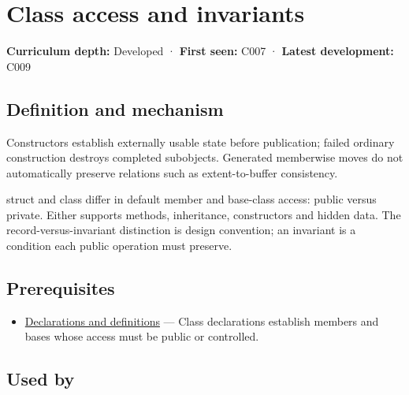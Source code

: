 \hypertarget{appendix-8e5214819615}{}\label{referencestart:appendix-8e5214819615}
\section{Class access and invariants}\label{appendix-8e5214819615-class-access-and-invariants}

\hypertarget{appendix-8e5214819615-class-access-and-invariants}{}

\textbf{Curriculum depth:} Developed · \textbf{First seen:} C007 · \textbf{Latest development:} C009

\begin{allmightroledefinition}

\subsection{Definition and mechanism}\label{appendix-8e5214819615-definition-and-mechanism}

\hypertarget{appendix-8e5214819615-definition-and-mechanism}{}

Constructors establish externally usable state before publication; failed ordinary construction destroys completed subobjects. Generated memberwise moves do not automatically preserve relations such as extent-to-buffer consistency.

\end{allmightroledefinition}

struct and class differ in default member and base-class access: public versus private. Either supports methods, inheritance, constructors and hidden data. The record-versus-invariant distinction is design convention; an invariant is a condition each public operation must preserve.

\subsection{Prerequisites}\label{appendix-8e5214819615-prerequisites}

\hypertarget{appendix-8e5214819615-prerequisites}{}

\begin{itemize}
\tightlist
\item
  \hyperref[appendix-2e4d494c2d94]{Declarations and definitions} --- Class declarations establish members and bases whose access must be public or controlled.
\end{itemize}

\subsection{Used by}\label{appendix-8e5214819615-used-by}

